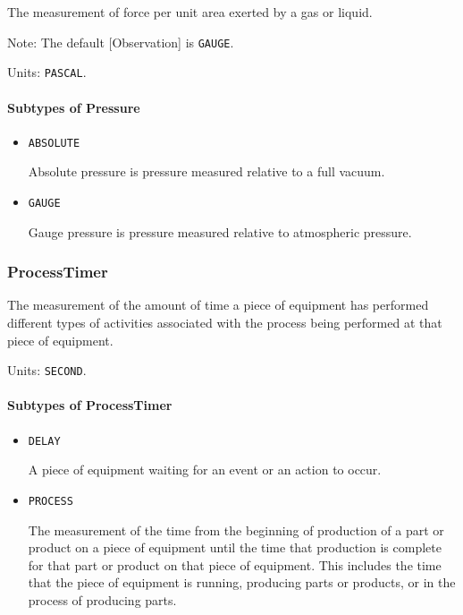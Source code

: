 The measurement of force per unit area exerted by a gas or liquid.

Note: The default [Observation] is \texttt{GAUGE}.


Units: \texttt{PASCAL}.

\paragraph{Subtypes of Pressure}\mbox{}
\label{sec:Subtypes of Pressure}

\begin{itemize}

\item \texttt{ABSOLUTE}


Absolute pressure is pressure measured relative to a full vacuum.

\item \texttt{GAUGE}


Gauge pressure is pressure measured relative to atmospheric pressure.


\end{itemize}

\subsubsection{ProcessTimer}
\label{sec:ProcessTimer}



The measurement of the amount of time a piece of equipment has performed different types of activities associated with the process being performed at that piece of equipment.


Units: \texttt{SECOND}.

\paragraph{Subtypes of ProcessTimer}\mbox{}
\label{sec:Subtypes of ProcessTimer}

\begin{itemize}

\item \texttt{DELAY}


A piece of equipment waiting for an event or an action to occur.

\item \texttt{PROCESS}


The measurement of the time from the beginning of production of a part or product on a piece of equipment until the time that production is complete for that part or product on that piece of equipment.  This includes the time that the piece of equipment is running, producing parts or products, or in the process of producing parts.


\end{itemize}

